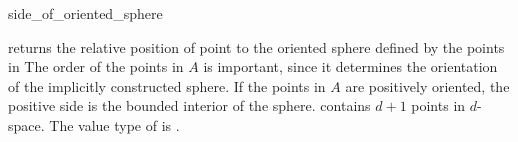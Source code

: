\begin{ccRefFunction}{side_of_oriented_sphere}

 { returns the relative position of
  point  to the oriented sphere defined by the points in
  \ccc{A = tuple [first,last)} The order of the points in $A$ is
  important, since it determines the orientation of the implicitly
  constructed sphere.  If the points in $A$ are positively oriented,
  the positive side is the bounded interior of the sphere.  \ccPrecond
   contains $d+1$ points in $d$-space.  \ccRequire The value
  type of  is .}

\end{ccRefFunction}

